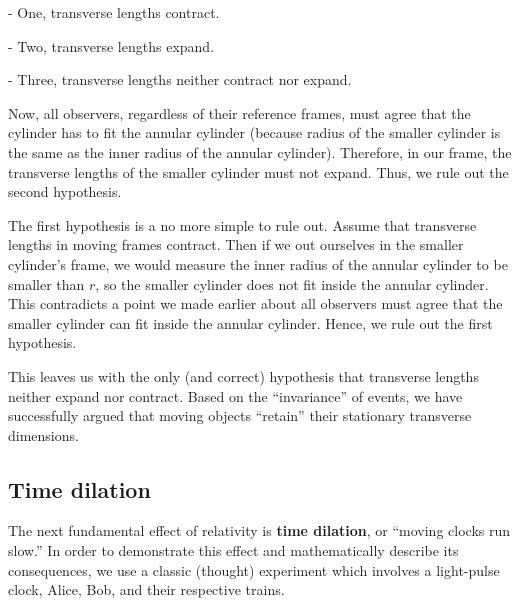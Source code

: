 \documentclass[a4paper,11pt]{article}
\numberwithin{equation}{section}
\begin{document}
 - One, transverse lengths contract.
 
 - Two, transverse lengths expand.
 
 - Three, transverse lengths neither contract nor expand.
 
 \noindent Now, all observers, regardless of their reference frames, must agree that the cylinder has to fit the annular cylinder (because radius of the smaller cylinder is the same as the inner radius of the annular cylinder). Therefore, in our frame, the transverse lengths of the smaller cylinder must not expand. Thus, we rule out the second hypothesis. 
 
 \noindent The first hypothesis is a no more simple to rule out. Assume that transverse lengths in moving frames contract. Then if we out ourselves in the smaller cylinder's frame, we would measure the inner radius of the annular cylinder to be smaller than $r$, so the smaller cylinder does not fit inside the annular cylinder. This contradicts a point we made earlier about all observers must agree that the smaller cylinder can fit inside the annular cylinder. Hence, we rule out the first hypothesis.
 
 \noindent This leaves us with the only (and correct) hypothesis that transverse lengths neither expand nor contract. Based on the ``invariance'' of events, we have successfully argued that moving objects ``retain'' their stationary transverse dimensions. 
 
 \subsection{Time dilation}
 The next fundamental effect of relativity is \textbf{time dilation}, or ``moving clocks run slow.'' In order to demonstrate this effect and mathematically describe its consequences, we use a classic (thought) experiment which involves a light-pulse clock, Alice, Bob, and their respective trains.
 
\end{document}
